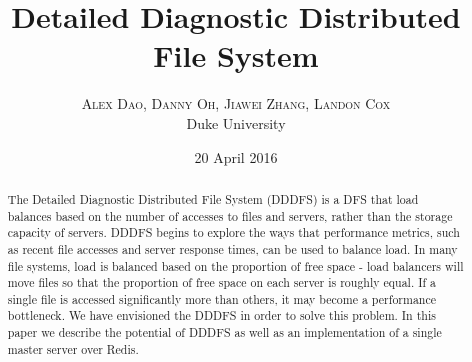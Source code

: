 \documentclass[twoside]{article}
\title{\vspace{-15mm}\fontsize{24pt}{10pt}\selectfont\textbf{Detailed Diagnostic Distributed File System}} %
\author{
\large
\textsc{Alex Dao, Danny Oh, Jiawei Zhang, Landon Cox}\\[2mm] %
\normalsize Duke University \\ %
\vspace{-5mm}
}
\date{20 April 2016}
\begin{document}
\maketitle %

\thispagestyle{fancy} %


\begin{abstract}

\noindent The Detailed Diagnostic Distributed File System (DDDFS) is a DFS that load balances based on the number of accesses to files and servers, rather than the storage capacity of servers. DDDFS begins to explore the ways that performance metrics, such as recent file accesses and server response times, can be used to balance load. In many file systems, load is balanced based on the proportion of free space - load balancers will move files so that the proportion of free space on each server is roughly equal. If a single file is accessed significantly more than others, it may become a performance bottleneck. We have envisioned the DDDFS in order to solve this problem. In this paper we describe the potential of DDDFS as well as an implementation of a single master server over Redis.

\end{abstract}

\end{document}
